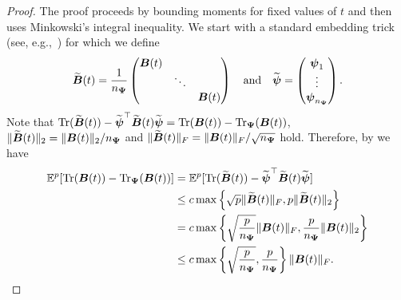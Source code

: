 \color{black}
\begin{proof}
    The proof proceeds by bounding moments for fixed values of $t$ and then uses Minkowski's integral inequality. We start with a standard embedding trick (see, e.g.,~\cite[Theorem 1]{cortinovis-2022-randomized-trace}) for which we define
    \begin{equation}
        \widetilde{\boldsymbol{B}}(t)
        = \frac{1}{n_{\boldsymbol{\Psi}}} \begin{pmatrix}
            \boldsymbol{B}(t) & & \\
            & \ddots & \\
            & & \boldsymbol{B}(t)
        \end{pmatrix}
        \quad \text{and} \quad
        \widetilde{\boldsymbol{\psi}} = \begin{pmatrix}
            \boldsymbol{\psi}_1 \\
            \vdots \\
            \boldsymbol{\psi}_{n_{\boldsymbol{\Psi}}}
        \end{pmatrix}.
    \end{equation}
    Note that $\operatorname{Tr}(\widetilde{\boldsymbol{B}}(t)) - \widetilde{\boldsymbol{\psi}}^{\top} \widetilde{\boldsymbol{B}}(t) \widetilde{\boldsymbol{\psi}} = \operatorname{Tr}(\boldsymbol{B}(t)) - \operatorname{Tr}_{\boldsymbol{\Psi}}(\boldsymbol{B}(t))$, $\lVert \widetilde{\boldsymbol{B}}(t) \rVert _2 = \lVert \boldsymbol{B}(t) \rVert _2 / n_{\boldsymbol{\Psi}}$ and $\lVert \widetilde{\boldsymbol{B}}(t) \rVert _F = \lVert \boldsymbol{B}(t) \rVert _F / \sqrt{n_{\boldsymbol{\Psi}}}$ hold. Therefore, by  we have
    \begin{align}
        \mathbb{E}^{p}[\operatorname{Tr}(\boldsymbol{B}(t)) - \operatorname{Tr}_{\boldsymbol{\Psi}}(\boldsymbol{B}(t))]
        &= \mathbb{E}^{p}[\operatorname{Tr}(\widetilde{\boldsymbol{B}}(t)) - \widetilde{\boldsymbol{\psi}}^{\top} \widetilde{\boldsymbol{B}}(t) \widetilde{\boldsymbol{\psi}}] \notag \\
        &\leq c \max\left\{ \sqrt{p} \lVert \widetilde{\boldsymbol{B}}(t) \rVert _F, p \lVert \widetilde{\boldsymbol{B}}(t) \rVert _2 \right\} \notag \\
        &= c \max\left\{ \sqrt{\frac{p}{n_{\boldsymbol{\Psi}}}} \lVert \boldsymbol{B}(t) \rVert _F, \frac{p}{n_{\boldsymbol{\Psi}}} \lVert \boldsymbol{B}(t) \rVert _2 \right\} \notag \\
        &\leq c \max\left\{ \sqrt{\frac{p}{n_{\boldsymbol{\Psi}}}}, \frac{p}{n_{\boldsymbol{\Psi}}} \right\}  \lVert \boldsymbol{B}(t) \rVert _F.
        \label{equ:moment-bound-hanson-wright}
    \end{align}


\end{proof}

